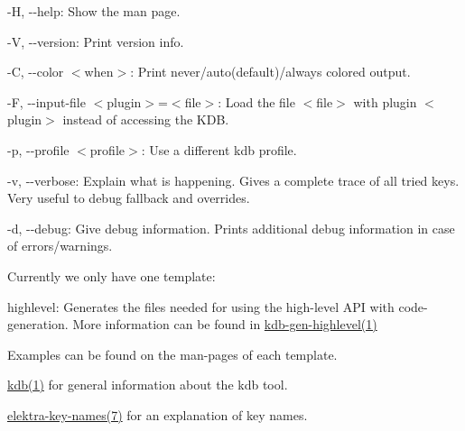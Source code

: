 \begin{DoxyItemize}
\item {\ttfamily -\/H}, {\ttfamily -\/-\/help}\+: Show the man page.
\item {\ttfamily -\/V}, {\ttfamily -\/-\/version}\+: Print version info.
\item {\ttfamily -\/C}, {\ttfamily -\/-\/color $<$when$>$}\+: Print never/auto(default)/always colored output.
\item {\ttfamily -\/F}, {\ttfamily -\/-\/input-\/file $<$plugin$>$=$<$file$>$}\+: Load the file {\ttfamily $<$file$>$} with plugin {\ttfamily $<$plugin$>$} instead of accessing the K\+DB.
\item {\ttfamily -\/p}, {\ttfamily -\/-\/profile $<$profile$>$}\+: Use a different kdb profile.
\item {\ttfamily -\/v}, {\ttfamily -\/-\/verbose}\+: Explain what is happening. Gives a complete trace of all tried keys. Very useful to debug fallback and overrides.
\item {\ttfamily -\/d}, {\ttfamily -\/-\/debug}\+: Give debug information. Prints additional debug information in case of errors/warnings.
\end{DoxyItemize}

Currently we only have one template\+:


\begin{DoxyItemize}
\item {\ttfamily highlevel}\+: Generates the files needed for using the high-\/level A\+PI with code-\/generation. More information can be found in \hyperlink{doc_help_kdb-gen-highlevel_md}{kdb-\/gen-\/highlevel(1)}
\end{DoxyItemize}

Examples can be found on the man-\/pages of each template.


\begin{DoxyItemize}
\item \hyperlink{doc_help_kdb_md}{kdb(1)} for general information about the {\ttfamily kdb} tool.
\item \hyperlink{doc_help_elektra-key-names_md}{elektra-\/key-\/names(7)} for an explanation of key names. 
\end{DoxyItemize}